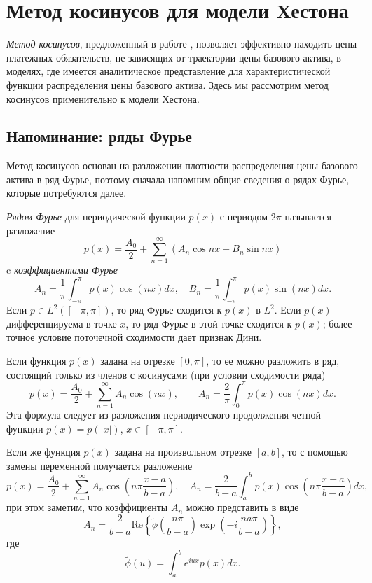 \chapter{Метод косинусов для модели Хестона}
\label{ch:cos-method}

\emph{Метод косинусов}, предложенный в работе \cite{FangOosterlee09}, позволяет эффективно находить цены платежных обязательств, не зависящих от траектории цены базового актива, в моделях, где имеется аналитическое представление для характеристической функции распределения цены базового актива.
Здесь мы рассмотрим метод косинусов применительно к модели Хестона.


\section{Напоминание: ряды Фурье}

Метод косинусов основан на разложении плотности распределения цены базового актива в ряд Фурье, поэтому сначала напомним общие сведения о рядах Фурье, которые потребуются далее.

\emph{Рядом Фурье} для периодической функции $p(x)$ с периодом $2\pi$ называется разложение
\[
p(x) = \frac{A_0}{2} + \sum_{n=1}^\infty (A_n\cos nx + B_n \sin nx)
\]
c \emph{коэффициентами Фурье}
\[
A_n = \frac{1}{\pi}\int_{-\pi}^\pi p(x) \cos(nx) dx, \quad 
B_n = \frac{1}{\pi}\int_{-\pi}^\pi p(x) \sin(nx) dx.
\]
Если $p\in L^2([-\pi,\pi])$, то ряд Фурье сходится к $p(x)$ в $L^2$. Если $p(x)$ дифференцируема в точке $x$, то ряд Фурье в этой точке сходится к $p(x)$; более точное условие поточечной сходимости дает признак Дини.

Если функция $p(x)$ задана на отрезке $[0,\pi]$, то ее можно разложить в ряд, состоящий только из членов с косинусами (при условии сходимости ряда)
\[
p(x) = \frac{A_0}{2} + \sum_{n=1}^\infty A_n \cos(nx), \qquad
A_n = \frac{2}{\pi}\int_0^\pi p(x) \cos(nx) dx.
\]
Эта формула следует из разложения периодического продолжения четной функции $\tilde p(x) = p(|x|)$, $x\in[-\pi,\pi]$.

Если же функция $p(x)$ задана на произвольном отрезке $[a,b]$, то с помощью замены переменной получается разложение
\begin{equation}
\label{cos:p-fourier}
p(x) = \frac{A_0}{2} + \sum_{n=1}^\infty A_n \cos\left(n\pi\frac{x-a}{b-a}\right), \quad
A_n = \frac{2}{b-a}\int_a^b p(x) \cos\left(n\pi\frac{x-a}{b-a}\right) dx,
\end{equation}
при этом заметим, что коэффициенты $A_n$ можно представить в виде
\begin{equation}
\label{cos:A}
A_n = \frac{2}{b-a} \mathrm{Re}\left\{ \tilde\phi\left(\frac{n\pi}{b-a}\right)\exp\left(-i\frac{na\pi}{b-a}\right) \right\},
\end{equation}
где
\[
\tilde\phi(u) = \int_a^b e^{iux} p(x) dx.
\]


